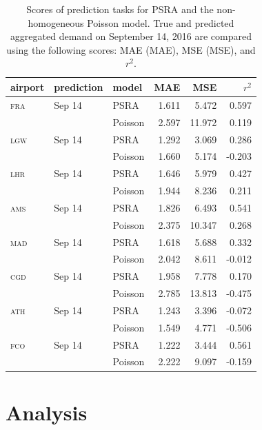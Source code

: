 \documentclass[draft,review]{elsarticle}
\newcommand{\airp}[1]{\textcolor{#1}{\textsc{#1}}}
\begin{document}
\begin{table}
  \centering
  \caption{Scores of prediction tasks for \acs{PSRA} and the non-homogeneous Poisson model. True and predicted aggregated demand on September 14, 2016 are compared using the following scores: \acl{MAE} (\acs{MAE}), \acl{MSE} (\acs{MSE}), and \(r^2\).}\label{tab:predictions_last_day}
  \begin{tabular}{lllrrr}
    \toprule
    airport    & prediction & model & \acs{MAE} & \acs{MSE} & \(r^2\)  \\
    \midrule
    \airp{fra} & Sep 14    & \acs{PSRA} &  1.611 &   5.472 &  0.597 \\
         &                  & Poisson    &  2.597 &  11.972 &  0.119 \\
    \airp{lgw} & Sep 14    & \acs{PSRA} &  1.292 &   3.069 &  0.286 \\
         &                  & Poisson    &  1.660 &   5.174 & -0.203 \\
    \airp{lhr} & Sep 14    & \acs{PSRA} &  1.646 &   5.979 &  0.427 \\
         &                  & Poisson    &  1.944 &   8.236 &  0.211 \\
    \airp{ams} & Sep 14    & \acs{PSRA} &  1.826 &   6.493 &  0.541 \\
         &                  & Poisson    &  2.375 &  10.347 &  0.268 \\
    \airp{mad} & Sep 14    & \acs{PSRA} &  1.618 &   5.688 &  0.332 \\
         &                  & Poisson    &  2.042 &   8.611 & -0.012 \\
    \airp{cgd} & Sep 14    & \acs{PSRA} &  1.958 &   7.778 &  0.170 \\
         &                  & Poisson    &  2.785 &  13.813 & -0.475 \\
    \airp{ath} & Sep 14    & \acs{PSRA} &  1.243 &   3.396 & -0.072 \\
         &                  & Poisson    &  1.549 &   4.771 & -0.506 \\
    \airp{fco} & Sep 14    & \acs{PSRA} &  1.222 &   3.444 &  0.561 \\
         &                  & Poisson    &  2.222 &   9.097 & -0.159 \\
    \bottomrule
  \end{tabular}
\end{table}

\section{Analysis}\label{sec:analysis}
\end{document}
